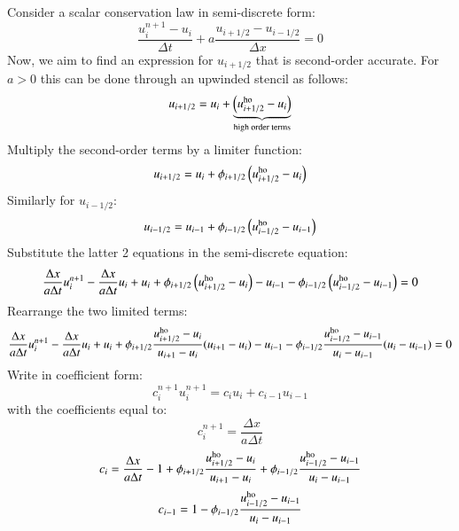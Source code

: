 \documentclass{warpdoc}
\begin{document}
Consider a scalar conservation law in semi-discrete form:
%
\begin{equation}
\frac{u^{n+1}_i - u_i }{\Delta t} + a \frac{u_{i+1/2}-u_{i-1/2}}{\Delta x} =0
\end{equation}
%
Now, we aim to find an expression for $u_{i+1/2}$ that is second-order accurate. For $a>0$ this can be done through an upwinded stencil as follows:
%
\begin{equation}
u_{i+1/2} = u_i + \underbrace{\left( u_{i+1/2}^{\rm ho} - u_i \right)}_{\textrm{high order terms}}
\end{equation}
% 
Multiply the second-order terms by a limiter function:
%
\begin{equation}
u_{i+1/2} = u_i +  \phi_{i+1/2} \left( u_{i+1/2}^{\rm ho} - u_i \right)
\end{equation}
% 
Similarly for $u_{i-1/2}$:
%
\begin{equation}
u_{i-1/2} = u_{i-1} + \phi_{i-1/2} \left( u_{i-1/2}^{\rm ho} - u_{i-1} \right)
\end{equation}
% 
Substitute the latter 2 equations in the semi-discrete equation:
%
\begin{equation}
\frac{\Delta x}{a\Delta t} u^{n+1}_i - \frac{\Delta x}{a\Delta t} u_i  
+ u_i + \phi_{i+1/2} \left( u_{i+1/2}^{\rm ho} - u_{i} \right)
- u_{i-1} - \phi_{i-1/2} \left( u_{i-1/2}^{\rm ho} - u_{i-1} \right) 
= 0
\end{equation}
%
Rearrange the two limited terms:
%
\begin{equation}
\frac{\Delta x}{a\Delta t} u^{n+1}_i - \frac{\Delta x}{a\Delta t} u_i  
+ u_i + \phi_{i+1/2} \frac{u_{i+1/2}^{\rm ho} - u_{i}}{u_{i+1}-u_i} (u_{i+1}-u_{i})
- u_{i-1} - \phi_{i-1/2} \frac{u_{i-1/2}^{\rm ho} - u_{i-1}}{u_{i} - u_{i-1}}(u_i-u_{i-1}) 
= 0
\end{equation}
%
Write in coefficient form:
%
\begin{equation}
c_i^{n+1} u^{n+1}_i = 
  c_i u_i  
+ c_{i-1} u_{i-1}
\end{equation}
%
with the coefficients equal to:
%
\begin{equation}
c_i^{n+1}=\frac{\Delta x}{a\Delta t}
\end{equation}
%
%
\begin{equation}
c_i=\frac{\Delta x}{a\Delta t} - 1 +  \phi_{i+1/2} \frac{u_{i+1/2}^{\rm ho} - u_{i}}{u_{i+1}-u_i}
 +  \phi_{i-1/2} \frac{u_{i-1/2}^{\rm ho} - u_{i-1}}{u_{i} - u_{i-1}}
\end{equation}
%
%
\begin{equation}
c_{i-1}=1 -\phi_{i-1/2} \frac{u_{i-1/2}^{\rm ho} - u_{i-1}}{u_{i} - u_{i-1}}
\end{equation}
\end{document}

